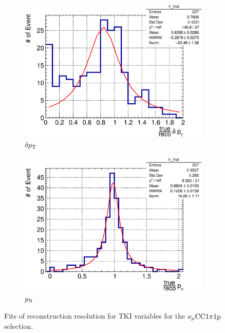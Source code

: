 \begin{figure}
          \\
          \begin{subfigure}[b]{\dbfigwid\textwidth}
               \centering
               \includegraphics[width=\textwidth]{figures/perf/tki/SFGpTPCmu_dpt_rat_hist_al14.eps}
               \caption{$\delta p_\textrm{T}$}
               \label{subfig:1pi-dpt}
          \end{subfigure}
          \begin{subfigure}[b]{\dbfigwid\textwidth}
               \centering
               \includegraphics[width=\textwidth]{figures/perf/tki/SFGpTPCmu_pn_rat_hist_al14.eps}
               \caption{$p_\textrm{N}$}
               \label{subfig:1pi-pn}
          \end{subfigure}
          \caption{Fits of reconstruction resolution for TKI variables for the $\nu_{\mu}\textrm{CC}1\pi1\textrm{p}$ selection.}
          \label{fig:mc-tki-1pi}
     \end{figure}

